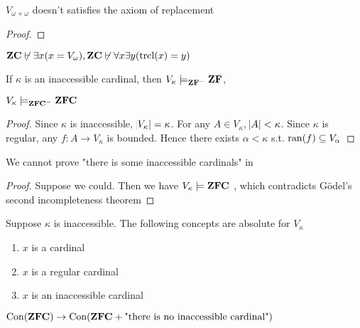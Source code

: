 \documentclass[11pt]{article}
\begin{document}
\begin{corollary}[]
\(V_{\omega+\omega}\) doesn't satisfies the axiom of replacement
\end{corollary}

\begin{proof}
   
\end{proof}

\begin{theorem}[]
\(\textbf{ZC}\not\vdash\exists x(x=V_\omega),\textbf{ZC}\not\vdash\forall x\exists y(\mathrm{trcl}{(x)}=y)\)
\end{theorem}

\begin{theorem}[]
If \(\kappa\) is an inaccessible cardinal, then \(V_\kappa\models_{\textbf{ZF}^-}\textbf{ZF}\),\par
\(V_\kappa\models_{\textbf{ZFC}^-}\textbf{ZFC }\)
\end{theorem}

\begin{proof}
Since \(\kappa\) is inaccessible, \(\abs{V_\kappa}=\kappa\). For any \(A\in
   V_\kappa\), \(\abs{A}<\kappa\). Since \(\kappa\) is regular, any 
\(f:A\to V_\kappa\) is bounded. Hence there exists \(\alpha<\kappa\) s.t. 
\(\mathrm{ran}{(f)}\subseteq V_\alpha\)
\end{proof}

\begin{corollary}[]
We cannot prove "there is some inaccessible cardinals" in \zfc
\end{corollary}

\begin{proof}
Suppose we could. Then we have \(V_\kappa\models\textbf{ZFC }\), which contradicts
Gödel’s second incompleteness theorem 
\end{proof}

\begin{lemma}[]
Suppose \(\kappa\) is inaccessible. The following concepts are absolute for
\(V_\kappa\) 
\begin{enumerate}
\item \(x\) is a cardinal
\item \(x\) is a regular cardinal
\item \(x\) is an inaccessible cardinal
\end{enumerate}
\end{lemma}

\begin{lemma}[]
\(\text{Con}(\textbf{ZFC})\to\text{Con}(\textbf{ZFC}+\text{"there is no inaccessible cardinal"})\)
\end{lemma}
\end{document}
